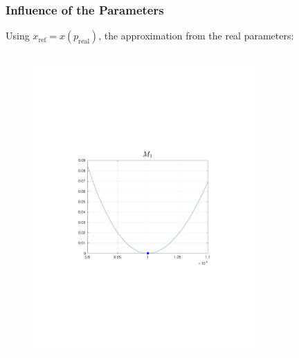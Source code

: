 \documentclass{beamer}
\begin{document}
\begin{frame}
    \frametitle{Influence of the Parameters}
    Using $x_{\text{ref}} = x(p_{\text{real}})$, the approximation from the real parameters:
    \begin{columns}[t]
        \begin{figure}
            \centering
            \includegraphics[trim=4cm 4cm 4cm 8cm, clip=true, width=\linewidth]{img/MassApproxComp}
        \end{figure}
        \begin{figure}
            \centering

\end{figure}
\end{columns}
\end{frame}
\end{document}
